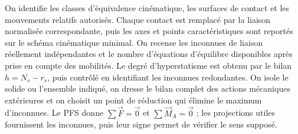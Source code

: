\begin{corrigebox}[Corrigé]
On identifie les classes d'équivalence cinématique, les surfaces de contact et les mouvements relatifs autorisés. Chaque contact est remplacé par la liaison normalisée correspondante, puis les axes et points caractéristiques sont reportés sur le schéma cinématique minimal.
On recense les inconnues de liaison réellement indépendantes et le nombre d'équations d'équilibre disponibles après prise en compte des mobilités. Le degré d'hyperstatisme est obtenu par le bilan $h=N_s-r_s$, puis contrôlé en identifiant les inconnues redondantes.
On isole le solide ou l'ensemble indiqué, on dresse le bilan complet des actions mécaniques extérieures et on choisit un point de réduction qui élimine le maximum d'inconnues. Le PFS donne $\sum\vec F=\vec0$ et $\sum\vec M_A=\vec0$ ; les projections utiles fournissent les inconnues, puis leur signe permet de vérifier le sens supposé.
\end{corrigebox}
